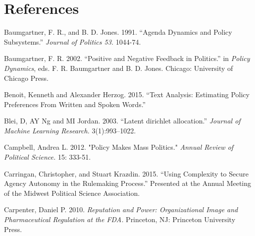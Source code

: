 \section{References}

\hangindent=0.7cm
\flushleft

Baumgartner, F. R., and B. D. Jones.  1991.  ``Agenda Dynamics and Policy Subsystems.''  \textit{Journal of Politics 53.} 1044-74.

Baumgartner, F. R.  2002.  ``Positive and Negative Feedback in Politics.''  in \textit{Policy Dynamics}, eds.  F. R. Baumgartner and B. D. Jones.  Chicago: University of Chicago Press.



Benoit, Kenneth and Alexander Herzog. 2015. “Text Analysis: Estimating Policy Preferences From Written and Spoken Words.”

Blei, D, AY Ng and MI Jordan. 2003. “Latent dirichlet allocation.” \textit{Journal of Machine Learning Research.} 3(1):993–1022.




Campbell, Andrea L. 2012. "Policy Makes Mass Politics." \textit{Annual Review of Political Science.} 15: 333-51.

Carringan, Christopher, and Stuart Krazdin. 2015. ``Using Complexity to Secure Agency Autonomy in the Rulemaking Process.'' Presented at the Annual Meeting of the Midwest Political Science Association.

Carpenter, Daniel P. 2010. \textit{Reputation and Power: Organizational Image and Pharmaceutical Regulation at the FDA.} Princeton, NJ: Princeton University Press.

